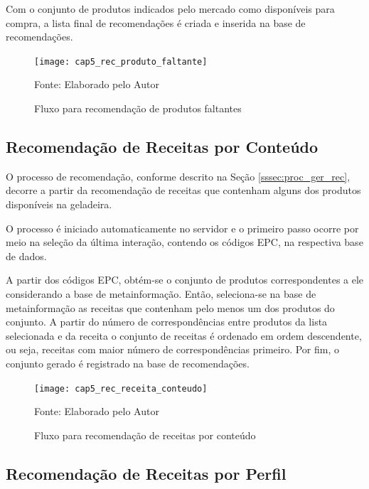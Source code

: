 Com o conjunto de produtos indicados pelo mercado como disponíveis para compra, a lista final de recomendações é criada e inserida na base de recomendações.

\begin{figure}[H]
    \caption{Fluxo para recomendação de produtos faltantes} 
    \label{fig:cap5_rec_produto_faltante}
    \texttt{[image: cap5\_rec\_produto\_faltante]}
    
    \footnotesize{Fonte: Elaborado pelo Autor}
\end{figure}

\subsection{Recomendação de Receitas por Conteúdo}

O processo de recomendação, conforme descrito na Seção \ref{sssec:proc_ger_rec}, decorre a partir da recomendação de receitas que contenham alguns dos produtos disponíveis na geladeira. 

O processo é iniciado automaticamente no servidor e o primeiro passo ocorre por meio na seleção da última interação, contendo os códigos EPC, na respectiva base de dados.

A partir dos códigos EPC, obtém-se o conjunto de produtos correspondentes a ele considerando a base de metainformação. Então, seleciona-se na base de metainformação as receitas que contenham pelo menos um dos produtos do conjunto. A partir do número de correspondências entre produtos da lista selecionada e da receita o conjunto de receitas é ordenado em ordem descendente, ou seja, receitas com maior número de correspondências primeiro. Por fim, o conjunto gerado é registrado na base de recomendações.

\begin{figure}[H]
    \caption{Fluxo para recomendação de receitas por conteúdo} 
    \label{fig:cap5_rec_receita_conteudo}
    \texttt{[image: cap5\_rec\_receita\_conteudo]}
    
    \footnotesize{Fonte: Elaborado pelo Autor}
\end{figure}

\subsection{Recomendação de Receitas por Perfil}


